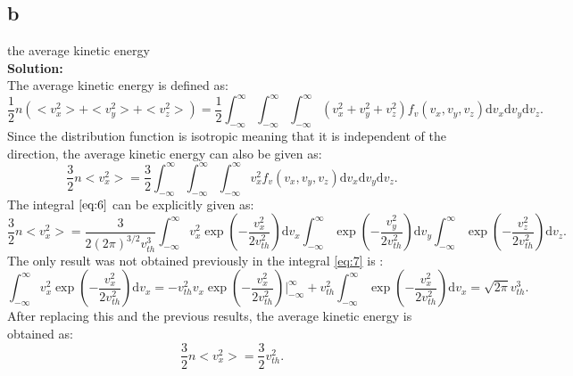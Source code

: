 \documentclass[11pt]{amsart}
\begin{document}
\subsection*{b}
the average kinetic energy
\\
\textbf{Solution:}\\
The average kinetic energy is defined as:
\begin{equation}
\label{eq:6}
\frac{1}{2}n(<v_{x}^2>+<v_{y}^2>+<v_{z}^2>)=\frac{1}{2}\int_{-\infty}^{\infty}\int_{-\infty}^{\infty}\int_{-\infty}^{\infty}(v_{x}^2+v_{y}^2+v_{z}^2)f_v(v_x,v_y,v_z)\mathrm{d}v_x\mathrm{d}v_y\mathrm{d}v_z.
\end{equation}
Since the distribution function is isotropic meaning that it is independent of the direction, the average kinetic energy can also be given as:
\begin{equation}
\label{eq:6}
\frac{3}{2}n<v_{x}^2>=\frac{3}{2}\int_{-\infty}^{\infty}\int_{-\infty}^{\infty}\int_{-\infty}^{\infty}v_{x}^2f_v(v_x,v_y,v_z)\mathrm{d}v_x\mathrm{d}v_y\mathrm{d}v_z.
\end{equation}
The integral $\ref{eq:6}$ can be explicitly given as:
\begin{equation}
\label{eq:7}
\frac{3}{2}n<v_{x}^2>=\frac{3}{2(2 \pi)^{3/2}v_{th}^3}\int_{-\infty}^{\infty}v_{x}^2\exp(-\frac{v_{x}^2}{2 v_{th}^2})\mathrm{d}v_x\int_{-\infty}^{\infty}\exp(-\frac{v_{y}^2}{2 v_{th}^2})\mathrm{d}v_y\int_{-\infty}^{\infty}\exp(-\frac{v_{z}^2}{2 v_{th}^2})\mathrm{d}v_z.
\end{equation}
The only result was not obtained previously in the integral \ref{eq:7} is :
\begin{equation}
\label{eq:8}
\int_{-\infty}^{\infty}v_{x}^2\exp(-\frac{v_{x}^2}{2 v_{th}^2})\mathrm{d}v_x=-v_{th}^2 v_x\exp(-\frac{v_{x}^2}{2 v_{th}^2})\Biggr|_{-\infty}^{\infty}+v_{th}^2\int_{-\infty}^{\infty}\exp(-\frac{v_{x}^2}{2 v_{th}^2})\mathrm{d}v_x=\sqrt{2 \pi}v_{th}^3.
\end{equation}
After replacing this and the previous results, the average kinetic energy is obtained as:
\begin{equation}
\label{eq:7}
\frac{3}{2}n<v_{x}^2>=\frac{3}{2}v_{th}^2.
\end{equation}
\end{document}
